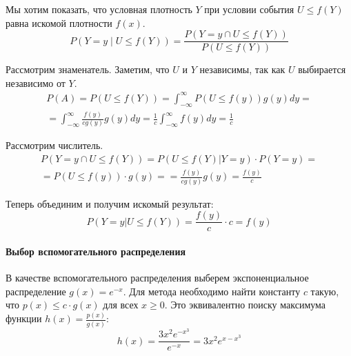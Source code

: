 \documentclass[a4paper,14pt]{extarticle}
\begin{document}
                    Мы хотим показать, что условная плотность $Y$ при условии события $U \leq f(Y)$ равна искомой плотности $f(x)$.
                    \[
                    P(Y = y \mid U \leq f(Y)) =
                    \frac{P(Y = y \cap U \leq f(Y))}{P(U \leq f(Y))}
                    \]
                    
                    Рассмотрим знаменатель. Заметим, что $U$ и $Y$ независимы, так как $U$ выбирается независимо от $Y$.
                    \begin{gather*}
                            P(A) =
                            P(U \leq f(Y)) =
                            \int_{-\infty}^{\infty} P(U \leq f(y)) g(y) dy =\\
                            = \int_{-\infty}^{\infty} \frac{f(y)}{cg(y)} g(y) dy =
                            \frac{1}{c} \int_{-\infty}^{\infty} f(y) dy =
                            \frac{1}{c}
                    \end{gather*}
                    
                    Рассмотрим числитель.
                    \begin{gather*}
                            P(Y = y \cap U\le f(Y)) = P(U\le f(Y) | Y = y) \cdot P (Y = y) =\\
                            = P(U\le f(y)) \cdot g(y) =
                            = \frac{f(y)}{cg(y)}g(y) = \frac{f(y)}{c}
                    \end{gather*}
                    
                    Теперь объединим и получим искомый результат:
                    \[
                    P(Y=y|U\le f(Y)) =
                    \frac{f(y)}{c}\cdot c = f(y)
                    \]
                
                \paragraph{Выбор вспомогательного распределения}
                    
                    В качестве вспомогательного распределения выберем экспоненциальное распределение $g(x) = e^{-x}$.
                    Для метода необходимо найти константу $c$ такую, что $p(x) \leq c \cdot g(x)$ для всех $x \geq 0$.
                    Это эквивалентно поиску максимума функции $h(x) = \frac{p(x)}{g(x)}$:
                    \[
                    h(x) = \frac{3x^2 e^{-x^3}}{e^{-x}} = 3x^2 e^{x - x^3}
                    \]
                    
\end{document}
